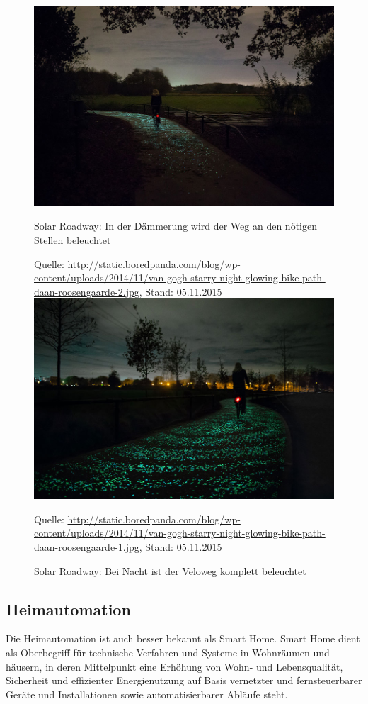 \begin{figure}[H]
  \centering
  \includegraphics[scale=0.5]{98_Bilder/03_Marktsegmente/solar_roadway_02}
  \caption[Solar Roadway in der Dämmerung]{Solar Roadway: In der Dämmerung wird der Weg an den nötigen Stellen beleuchtet}
  \footnotesize Quelle: \url{http://static.boredpanda.com/blog/wp-content/uploads/2014/11/van-gogh-starry-night-glowing-bike-path-daan-roosengaarde-2.jpg}, Stand: 05.11.2015
  \centering
  \includegraphics[scale=0.5]{98_Bilder/03_Marktsegmente/solar_roadway_01}
  \caption[Solar Roadway bei Nacht]{Solar Roadway: Bei Nacht ist der Veloweg komplett beleuchtet}
  \footnotesize Quelle: \url{http://static.boredpanda.com/blog/wp-content/uploads/2014/11/van-gogh-starry-night-glowing-bike-path-daan-roosengaarde-1.jpg}, Stand: 05.11.2015
\end{figure}
\newpage

\subsection{Heimautomation}
Die Heimautomation ist auch besser bekannt als Smart Home. Smart Home dient als Oberbegriff für technische Verfahren und Systeme in Wohnräumen und -häusern, in deren Mittelpunkt eine Erhöhung von Wohn- und Lebensqualität, Sicherheit und effizienter Energienutzung auf Basis vernetzter und fernsteuerbarer Geräte und Installationen sowie automatisierbarer Abläufe steht.

